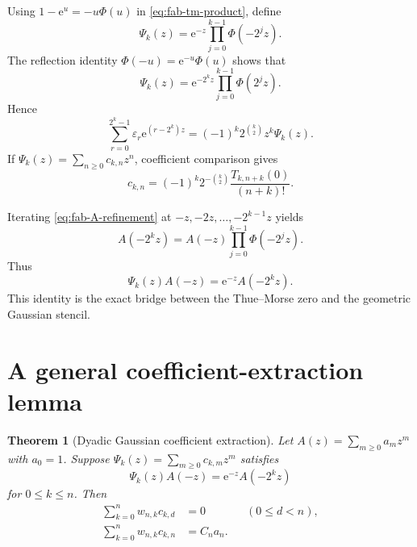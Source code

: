 \documentclass[11pt,oneside,openany]{book}
\newtheorem{theorem}{Theorem}[chapter]
\theoremstyle{definition}
\theoremstyle{remark}
\newcommand{\e}{\mathrm e}
\begin{document}
Using $1-\e^u=-u\Phi(u)$ in \eqref{eq:fab-tm-product}, define
\begin{equation}
 \Psi_k(z)=\e^{-z}\prod_{j=0}^{k-1}\Phi(-2^jz).
 \label{eq:fab-Psi}
\end{equation}
The reflection identity
\(
 \Phi(-u)=\e^{-u}\Phi(u)
\)
shows that
\begin{equation}
 \Psi_k(z)=\e^{-2^kz}\prod_{j=0}^{k-1}\Phi(2^jz).
 \label{eq:fab-Psi-positive}
\end{equation}
Hence
\begin{equation}
 \sum_{r=0}^{2^k-1}\varepsilon_r\e^{(r-2^k)z}
 =(-1)^k2^{\binom k2}z^k\Psi_k(z).
 \label{eq:fab-tm-normalized}
\end{equation}
If
\(
 \Psi_k(z)=\sum_{n\ge0}c_{k,n}z^n
\), coefficient comparison gives
\begin{equation}
 c_{k,n}=(-1)^k2^{-\binom k2}
 \frac{T_{k,n+k}(0)}{(n+k)!}.
 \label{eq:fab-c-T}
\end{equation}

Iterating \eqref{eq:fab-A-refinement} at $-z,-2z,\ldots,-2^{k-1}z$ yields
\[
 A(-2^kz)=A(-z)\prod_{j=0}^{k-1}\Phi(-2^jz).
\]
Thus
\begin{equation}
 \Psi_k(z)A(-z)=\e^{-z}A(-2^kz).
 \label{eq:fab-bridge}
\end{equation}
This identity is the exact bridge between the Thue--Morse zero and the geometric Gaussian stencil.

\section{A general coefficient-extraction lemma}

\begin{theorem}[Dyadic Gaussian coefficient extraction]\label{thm:fab-coefficient-extraction}
Let $A(z)=\sum_{m\ge0}a_mz^m$ with $a_0=1$.  Suppose
\(
 \Psi_k(z)=\sum_{m\ge0}c_{k,m}z^m
\)
satisfies
\begin{equation}
 \Psi_k(z)A(-z)=\e^{-z}A(-2^kz)
 \label{eq:fab-abstract-bridge}
\end{equation}
for $0\le k\le n$.  Then
\begin{align}
 \sum_{k=0}^nw_{n,k}c_{k,d}&=0 &&(0\le d<n),\label{eq:fab-weighted-c-zero}\\
 \sum_{k=0}^nw_{n,k}c_{k,n}&=C_na_n.
 \label{eq:fab-weighted-c-top}
\end{align}
\end{theorem}
\end{document}
